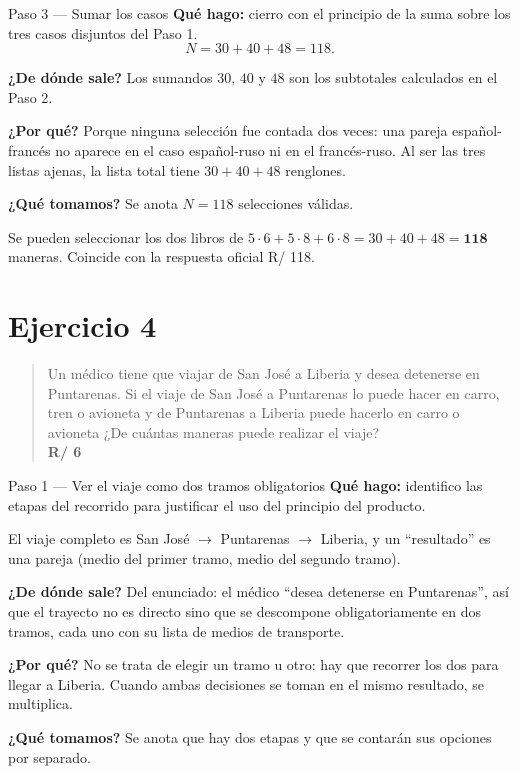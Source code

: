 \documentclass[11pt]{article}
\begin{document}
\begin{paso}{Paso 3 --- Sumar los casos}
\textbf{Qué hago:} cierro con el principio de la suma sobre los tres casos disjuntos del Paso 1.
\[
  N = 30+40+48 = 118 .
\]

\textbf{¿De dónde sale?} Los sumandos $30$, $40$ y $48$ son los subtotales calculados en el Paso 2.

\textbf{¿Por qué?} Porque ninguna selección fue contada dos veces: una pareja español-francés no aparece en el caso español-ruso ni en el francés-ruso. Al ser las tres listas ajenas, la lista total tiene $30+40+48$ renglones.

\textbf{¿Qué tomamos?} Se anota $N=118$ selecciones válidas.
\end{paso}

\begin{resp}
Se pueden seleccionar los dos libros de $5\cdot 6+5\cdot 8+6\cdot 8=30+40+48=\mathbf{118}$ maneras. Coincide con la respuesta oficial R/ 118.
\end{resp}

\section*{Ejercicio 4}

\begin{quote}
Un médico tiene que viajar de San José a Liberia y desea detenerse en Puntarenas. Si el viaje de San José a Puntarenas lo puede hacer en carro, tren o avioneta y de Puntarenas a Liberia puede hacerlo en carro o avioneta ¿De cuántas maneras puede realizar el viaje?\\[2pt]
\textbf{R/ 6}
\end{quote}

\begin{paso}{Paso 1 --- Ver el viaje como dos tramos obligatorios}
\textbf{Qué hago:} identifico las etapas del recorrido para justificar el uso del principio del producto.

El viaje completo es San José $\to$ Puntarenas $\to$ Liberia, y un ``resultado'' es una pareja (medio del primer tramo, medio del segundo tramo).

\textbf{¿De dónde sale?} Del enunciado: el médico ``desea detenerse en Puntarenas'', así que el trayecto no es directo sino que se descompone obligatoriamente en dos tramos, cada uno con su lista de medios de transporte.

\textbf{¿Por qué?} No se trata de elegir un tramo u otro: hay que recorrer los dos para llegar a Liberia. Cuando ambas decisiones se toman en el mismo resultado, se multiplica.

\textbf{¿Qué tomamos?} Se anota que hay dos etapas y que se contarán sus opciones por separado.
\end{paso}
\end{document}
